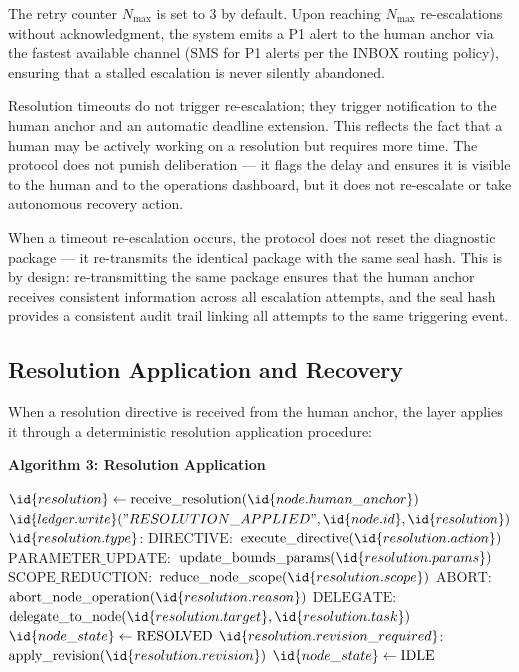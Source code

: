 \begin{definition}
\bigskip
The retry counter $N_{\text{max}}$ is set to 3 by default. Upon reaching $N_{\text{max}}$ re-escalations without acknowledgment, the system emits a P1 alert to the human anchor via the fastest available channel (SMS for P1 alerts per the INBOX routing policy), ensuring that a stalled escalation is never silently abandoned.

Resolution timeouts do not trigger re-escalation; they trigger notification to the human anchor and an automatic deadline extension. This reflects the fact that a human may be actively working on a resolution but requires more time. The protocol does not punish deliberation — it flags the delay and ensures it is visible to the human and to the operations dashboard, but it does not re-escalate or take autonomous recovery action.

When a timeout re-escalation occurs, the protocol does not reset the diagnostic package — it re-transmits the identical package with the same seal hash. This is by design: re-transmitting the same package ensures that the human anchor receives consistent information across all escalation attempts, and the seal hash provides a consistent audit trail linking all attempts to the same triggering event.

\subsection{Resolution Application and Recovery}
\label{sec:resolution}

When a resolution directive is received from the human anchor, the \bounds{} layer applies it through a deterministic resolution application procedure:

\bigskip
\noindent\textbf{Algorithm 3: Resolution Application}

\begin{algorithmic}
\State $\id{resolution} \gets \text{receive\_resolution}(\id{node.human\_anchor})$
\State $\id{ledger.write}("RESOLUTION\_APPLIED", \id{node.id}, \id{resolution})$
\State {} $\id{resolution.type}$:
\State \quad $\text{DIRECTIVE}:$ $\text{execute\_directive}(\id{resolution.action})$
\State \quad $\text{PARAMETER\_UPDATE}:$ $\text{update\_bounds\_params}(\id{resolution.params})$
\State \quad $\text{SCOPE\_REDUCTION}:$ $\text{reduce\_node\_scope}(\id{resolution.scope})$
\State \quad $\text{ABORT}:$ $\text{abort\_node\_operation}(\id{resolution.reason})$
\State \quad $\text{DELEGATE}:$ $\text{delegate\_to\_node}(\id{resolution.target}, \id{resolution.task})$
\State $\id{node\_state} \gets \text{RESOLVED}$
\State {} $\id{resolution.revision\_required}$:
\State \quad $\text{apply\_revision}(\id{resolution.revision})$
\State \quad $\id{node\_state} \gets \text{IDLE}$
\end{algorithmic}


\end{definition}
